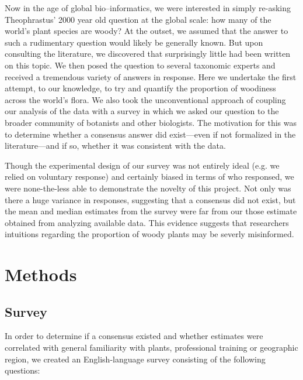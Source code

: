 \documentclass[12pt]{article}
\begin{document}
Now in the age of global bio--informatics, we were interested in simply re-asking Theophrastus' 2000 year old question at the global scale: how many of the world's plant species are woody? At the outset, we assumed that the answer to such a rudimentary question would likely be generally known. But upon consulting the literature, we discovered that surprisingly little had been written on this topic. We then posed the question to several taxonomic experts and received a tremendous variety of answers in response. Here we undertake the first attempt, to our knowledge, to try and quantify the proportion of woodiness across the world's flora. We also took the unconventional approach of coupling our analysis of the data with a survey in which we asked our question to the broader community of botanists and other biologists. The motivation for this was to determine whether a consensus answer did exist---even if not formalized in the literature---and if so, whether it was consistent with the data.

Though the experimental design of our survey was not entirely ideal (e.g. we relied on voluntary response) and certainly biased in terms of who responsed, we were none-the-less able to demonstrate the novelty of this project. Not only was there a huge variance in responses, suggesting that a consensus did not exist, but the mean and median estimates from the survey were far from our those estimate obtained from analyzing available data. This evidence suggests that researchers intuitions regarding the proportion of woody plants may be severly misinformed.

\section{Methods}
\subsection{Survey}
In order to determine if a consensus existed and whether estimates were correlated with general familiarity with plants, professional training or geographic region, we created an English-language survey consisting of the following questions:
\end{document}
